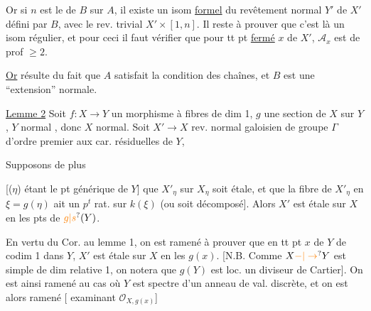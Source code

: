 Or  \unsure{,} si $n$ est le   de $B$ sur $A$,
il existe un isom \uline{formel} du
revêtement normal $Y'$ de $X'$ défini par $B$,
avec le rev. trivial $X'\times[1,n]$. Il
reste à prouver que c'est là un
isom régulier, et pour ceci il 
faut vérifier que pour tt pt \uline{fermé}
$x$ de $X'$,  $\mathscr A_x$ est de prof $\geq 2$.


\uline{Or}  résulte du fait que $A$
satisfait la condition des chaînes, et $B$
est une ``extension'' normale.


\uline{Lemme 2} \quad Soit $f:X\longrightarrow Y$ un morphisme
\llap{\smash{\rule[-13ex]{.4pt}{15ex}}\hspace{.65em}}  à fibres de dim 1,
$g$ une section de $X$ sur $Y$, $Y$ 
  normal , donc $X$ normal. Soit
$X'\longrightarrow X$ rev. normal galoisien de
groupe $\Gamma$  d'ordre premier aux
car. résiduelles de $Y$, 

Supposons de plus 

\deleted{[i.e. que la restriction de $X'$ à \unsure{?}
\deleted{fibre} \inserted{fibre gén} $X_{\unsure{\eta|y}}$ du \unsure{pt voisin} soit étale}

[($\eta$) étant le pt générique de $Y$] que
$X'_{\eta}$ sur $X_{\eta}$ soit étale, 
et que la fibre de $X'_{\eta}$ en $\xi=g(\eta)$ 
 ait un $p^{t}$ rat. sur $k(\xi)$ (ou
soit  décomposé]. Alors $X'$ est
étale sur $X$ en les pts de $\unsure{g|s}(Y)$.


En vertu du Cor. au lemme 1, on est
ramené à prouver que en tt pt
 $x$ de $Y$ de codim 1 dans $Y$, 
$X'$ est  étale sur $X$ en les
$g(x)$. [N.B. Comme $X\unsure{-|\to}Y$ est
simple de dim relative 1, on notera
que $g(Y)$ est  loc. un
diviseur de Cartier]. On est ainsi
ramené au cas où $Y$ est  spectre
d'un anneau de val. discrète, et  on
est alors ramené [ examinant $\mathscr O_{X,g(x)}$]

